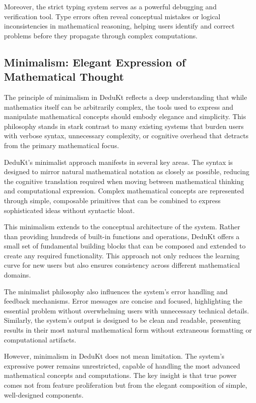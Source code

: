 Moreover, the strict typing system serves as a powerful debugging and verification tool.
Type errors often reveal conceptual mistakes or logical inconsistencies in mathematical reasoning, helping users identify and correct problems before they propagate through complex computations.

\subsection{Minimalism: Elegant Expression of Mathematical Thought}\label{subsec:minimalism:-elegant-expression-of-mathematical-thought}

The principle of minimalism in DeduKt reflects a deep understanding that while mathematics itself can be arbitrarily complex, the tools used to express and manipulate mathematical concepts should embody elegance and simplicity.
This philosophy stands in stark contrast to many existing systems that burden users with verbose syntax, unnecessary complexity, or cognitive overhead that detracts from the primary mathematical focus.

DeduKt's minimalist approach manifests in several key areas.
The syntax is designed to mirror natural mathematical notation as closely as possible, reducing the cognitive translation required when moving between mathematical thinking and computational expression.
Complex mathematical concepts are represented through simple, composable primitives that can be combined to express sophisticated ideas without syntactic bloat.

This minimalism extends to the conceptual architecture of the system.
Rather than providing hundreds of built-in functions and operations, DeduKt offers a small set of fundamental building blocks that can be composed and extended to create any required functionality.
This approach not only reduces the learning curve for new users but also ensures consistency across different mathematical domains.

The minimalist philosophy also influences the system's error handling and feedback mechanisms.
Error messages are concise and focused, highlighting the essential problem without overwhelming users with unnecessary technical details.
Similarly, the system's output is designed to be clean and readable, presenting results in their most natural mathematical form without extraneous formatting or computational artifacts.

However, minimalism in DeduKt does not mean limitation.
The system's expressive power remains unrestricted, capable of handling the most advanced mathematical concepts and computations.
The key insight is that true power comes not from feature proliferation but from the elegant composition of simple, well-designed components.

